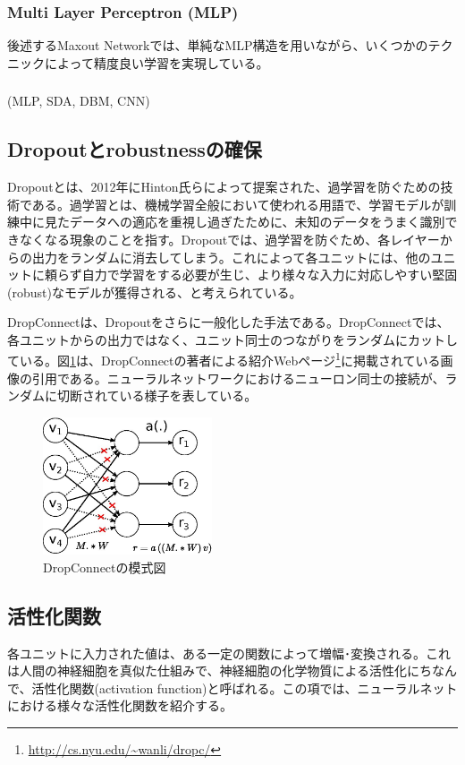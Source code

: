 \subsubsection{Multi Layer Perceptron (MLP)}
後述するMaxout Networkでは、単純なMLP構造を用いながら、いくつかのテクニックによって精度良い学習を実現している。
\subsubsection{}
(MLP, SDA, DBM, CNN)

\subsection{Dropoutとrobustnessの確保}
\label{c3_dropout}
Dropoutとは、2012年にHinton氏らによって提案された、過学習を防ぐための技術である\cite{hinton2012improving}。過学習とは、機械学習全般において使われる用語で、学習モデルが訓練中に見たデータへの適応を重視し過ぎたために、未知のデータをうまく識別できなくなる現象のことを指す。Dropoutでは、過学習を防ぐため、各レイヤーからの出力をランダムに消去してしまう。これによって各ユニットには、他のユニットに頼らず自力で学習をする必要が生じ、より様々な入力に対応しやすい堅固(robust)なモデルが獲得される、と考えられている。\par
DropConnectは、Dropoutをさらに一般化した手法である。DropConnectでは、各ユニットからの出力ではなく、ユニット同士のつながりをランダムにカットしている。図\ref{c3_dropconnect}は、DropConnectの著者による紹介Webページ\footnote{\url{http://cs.nyu.edu/~wanli/dropc/}}に掲載されている画像の引用である。ニューラルネットワークにおけるニューロン同士の接続が、ランダムに切断されている様子を表している。
\begin{figure}[tbp]
 \begin{center}
  \includegraphics[width=50mm]{img/c3/nn_dc}
 \end{center}
 \caption{DropConnectの模式図}
 \label{c3_dropconnect}
\end{figure}
\subsection{活性化関数}
各ユニットに入力された値は、ある一定の関数によって増幅･変換される。これは人間の神経細胞を真似た仕組みで、神経細胞の化学物質による活性化にちなんで、活性化関数(activation function)と呼ばれる。この項では、ニューラルネットにおける様々な活性化関数を紹介する。
